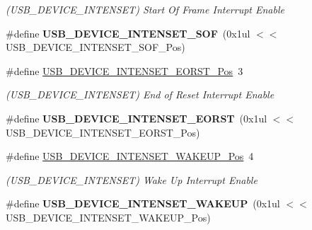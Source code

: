 \begin{DoxyCompactItemize}
\begin{DoxyCompactList}\small\item\em (U\+S\+B\+\_\+\+D\+E\+V\+I\+C\+E\+\_\+\+I\+N\+T\+E\+N\+S\+E\+T) Start Of Frame Interrupt Enable \end{DoxyCompactList}\item 
\hypertarget{group___s_a_m_l21___u_s_b_ga0e2f84d4b397eb9540e3c68cbc10f272}{}\#define {\bfseries U\+S\+B\+\_\+\+D\+E\+V\+I\+C\+E\+\_\+\+I\+N\+T\+E\+N\+S\+E\+T\+\_\+\+S\+O\+F}~(0x1ul $<$$<$ U\+S\+B\+\_\+\+D\+E\+V\+I\+C\+E\+\_\+\+I\+N\+T\+E\+N\+S\+E\+T\+\_\+\+S\+O\+F\+\_\+\+Pos)\label{group___s_a_m_l21___u_s_b_ga0e2f84d4b397eb9540e3c68cbc10f272}

\item 
\hypertarget{group___s_a_m_l21___u_s_b_gad41e2a9ed51dcb882cf4810257631116}{}\#define \hyperlink{group___s_a_m_l21___u_s_b_gad41e2a9ed51dcb882cf4810257631116}{U\+S\+B\+\_\+\+D\+E\+V\+I\+C\+E\+\_\+\+I\+N\+T\+E\+N\+S\+E\+T\+\_\+\+E\+O\+R\+S\+T\+\_\+\+Pos}~3\label{group___s_a_m_l21___u_s_b_gad41e2a9ed51dcb882cf4810257631116}

\begin{DoxyCompactList}\small\item\em (U\+S\+B\+\_\+\+D\+E\+V\+I\+C\+E\+\_\+\+I\+N\+T\+E\+N\+S\+E\+T) End of Reset Interrupt Enable \end{DoxyCompactList}\item 
\hypertarget{group___s_a_m_l21___u_s_b_ga0fce016e4da5eee33701eb4aa510c518}{}\#define {\bfseries U\+S\+B\+\_\+\+D\+E\+V\+I\+C\+E\+\_\+\+I\+N\+T\+E\+N\+S\+E\+T\+\_\+\+E\+O\+R\+S\+T}~(0x1ul $<$$<$ U\+S\+B\+\_\+\+D\+E\+V\+I\+C\+E\+\_\+\+I\+N\+T\+E\+N\+S\+E\+T\+\_\+\+E\+O\+R\+S\+T\+\_\+\+Pos)\label{group___s_a_m_l21___u_s_b_ga0fce016e4da5eee33701eb4aa510c518}

\item 
\hypertarget{group___s_a_m_l21___u_s_b_ga3703aaf4d2395b3b6aaeca49fa1ea1e0}{}\#define \hyperlink{group___s_a_m_l21___u_s_b_ga3703aaf4d2395b3b6aaeca49fa1ea1e0}{U\+S\+B\+\_\+\+D\+E\+V\+I\+C\+E\+\_\+\+I\+N\+T\+E\+N\+S\+E\+T\+\_\+\+W\+A\+K\+E\+U\+P\+\_\+\+Pos}~4\label{group___s_a_m_l21___u_s_b_ga3703aaf4d2395b3b6aaeca49fa1ea1e0}

\begin{DoxyCompactList}\small\item\em (U\+S\+B\+\_\+\+D\+E\+V\+I\+C\+E\+\_\+\+I\+N\+T\+E\+N\+S\+E\+T) Wake Up Interrupt Enable \end{DoxyCompactList}\item 
\hypertarget{group___s_a_m_l21___u_s_b_gad05970fc167a431aae27eca9e2a1b291}{}\#define {\bfseries U\+S\+B\+\_\+\+D\+E\+V\+I\+C\+E\+\_\+\+I\+N\+T\+E\+N\+S\+E\+T\+\_\+\+W\+A\+K\+E\+U\+P}~(0x1ul $<$$<$ U\+S\+B\+\_\+\+D\+E\+V\+I\+C\+E\+\_\+\+I\+N\+T\+E\+N\+S\+E\+T\+\_\+\+W\+A\+K\+E\+U\+P\+\_\+\+Pos)\label{group___s_a_m_l21___u_s_b_gad05970fc167a431aae27eca9e2a1b291}


\end{DoxyCompactItemize}
